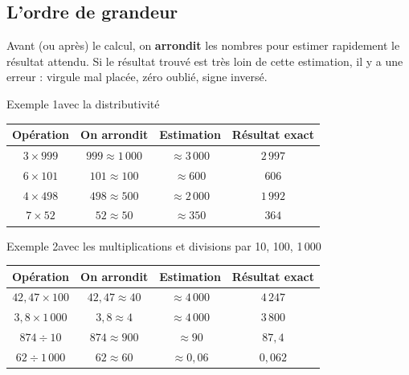 \subsection{L'ordre de grandeur}

\begin{theorie}
Avant (ou après) le calcul, on \textbf{arrondit} les nombres pour estimer rapidement le
résultat attendu. Si le résultat trouvé est très loin de cette estimation, il y a
une erreur : virgule mal placée, zéro oublié, signe inversé.
\end{theorie}

\begin{exemple}{Exemple 1}{avec la distributivité}
\begin{center}
\renewcommand{\arraystretch}{1.5}
\begin{tabular}{|c|c|c|c|}
\hline
\rowcolor{entete}
\textbf{Opération} & \textbf{On arrondit} & \textbf{Estimation} & \textbf{Résultat exact} \\
\hline
$3 \times 999$    & $999 \approx 1\,000$   & $\approx 3\,000$ & $2\,997$ \\ \hline
$6 \times 101$    & $101 \approx 100$      & $\approx 600$    & $606$ \\ \hline
$4 \times 498$    & $498 \approx 500$      & $\approx 2\,000$ & $1\,992$ \\ \hline
$7 \times 52$     & $52 \approx 50$        & $\approx 350$    & $364$ \\ \hline
\end{tabular}
\end{center}
\end{exemple}

\begin{exemple}{Exemple 2}{avec les multiplications et divisions par 10, 100, 1\,000}
\begin{center}
\renewcommand{\arraystretch}{1.5}
\begin{tabular}{|c|c|c|c|}
\hline
\rowcolor{entete}
\textbf{Opération} & \textbf{On arrondit} & \textbf{Estimation} & \textbf{Résultat exact} \\
\hline
$42{,}47 \times 100$ & $42{,}47 \approx 40$ & $\approx 4\,000$ & $4\,247$ \\ \hline
$3{,}8 \times 1\,000$& $3{,}8 \approx 4$    & $\approx 4\,000$ & $3\,800$ \\ \hline
$874 \div 10$        & $874 \approx 900$    & $\approx 90$     & $87{,}4$ \\ \hline
$62 \div 1\,000$     & $62 \approx 60$      & $\approx 0{,}06$ & $0{,}062$ \\ \hline
\end{tabular}
\end{center}
\end{exemple}

